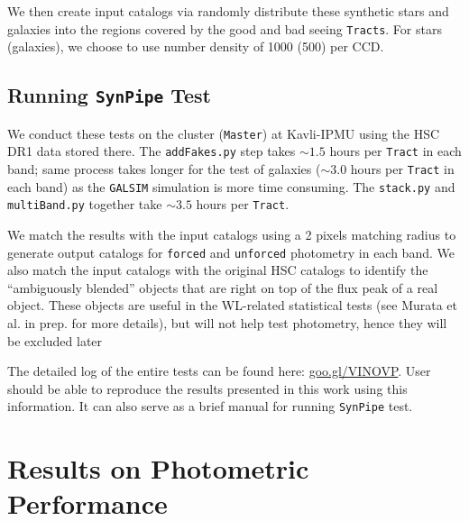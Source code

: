 \documentclass[useamsfonts]{pasj01}
\def\synpipe{\texttt{SynPipe}}
\def\forced{\texttt{forced}}
\def\unforced{\texttt{unforced}}
\def\tract{\texttt{Tract}}
\def\tracts{\texttt{Tracts}}
\def\galsim{\texttt{G}{\scriptsize \texttt{AL}}\texttt{S}{\scriptsize \texttt{IM}}}
\begin{document}
    We then create input catalogs via randomly distribute these synthetic stars and 
    galaxies into the regions covered by the good and bad seeing \tracts{}. 
    For stars (galaxies), we choose to use number density of 1000 (500)
    per CCD.
     


\subsection{Running \synpipe{} Test}
    \label{ssec:running}
    
    We conduct these tests on the cluster (\texttt{Master}) at Kavli-IPMU using 
    the HSC DR1 data stored there. 
    The \texttt{addFakes.py} step takes ${\sim}1.5$ hours per \tract{} in each 
    band; same process takes longer for the test of galaxies (${\sim}3.0$ hours per
    \tract{} in each band) as the \galsim{} simulation is more time consuming. 
    The \texttt{stack.py} and \texttt{multiBand.py} together take ${\sim}3.5$ hours
    per \tract{}. 
    
    We match the results with the input catalogs using a 2 pixels matching radius 
    to generate output catalogs for \forced{} and \unforced{} photometry 
    in each band. 
    We also match the input catalogs with the original HSC catalogs to identify the 
    ``ambiguously blended'' objects that are right on top of the flux peak of a real 
    object.  
    These objects are useful in the WL-related statistical tests (see Murata et al. 
    in prep. for more details), but will not help test photometry, hence they will 
    be excluded later 
    
    The detailed log of the entire tests can be found here:
    \url{goo.gl/VINOVP}.
    User should be able to reproduce the results presented in this work using this 
    information. 
    It can also serve as a brief manual for running \synpipe{} test.
    
   
\section{Results on Photometric Performance}
    \label{sec:result}
    
\end{document}
